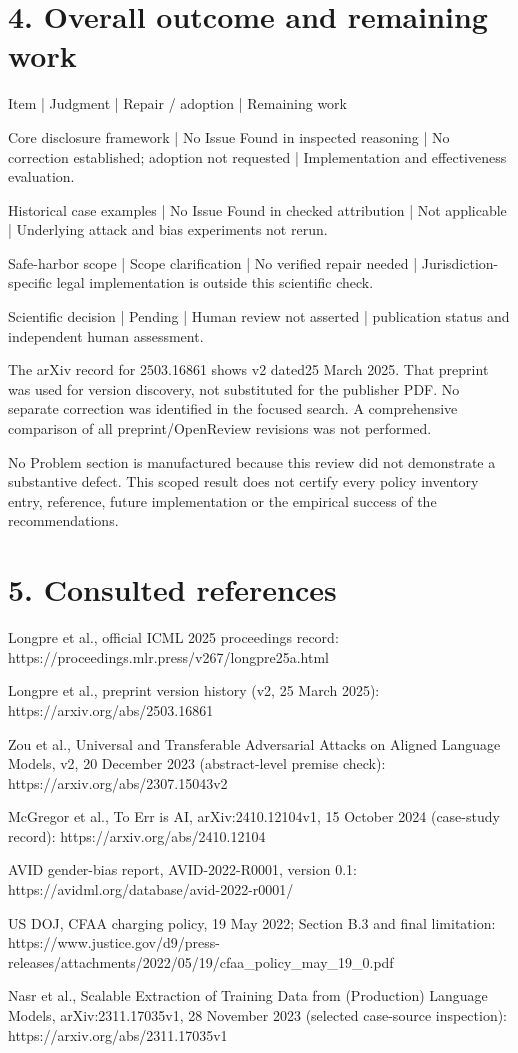\documentclass[10pt]{article}
\begin{document}
\section*{4. Overall outcome and remaining work}
Item | Judgment | Repair / adoption | Remaining work\par
Core disclosure framework | No Issue Found in inspected reasoning | No correction established; adoption not requested | Implementation and effectiveness evaluation.\par
Historical case examples | No Issue Found in checked attribution | Not applicable | Underlying attack and bias experiments not rerun.\par
Safe-harbor scope | Scope clarification | No verified repair needed | Jurisdiction-specific legal implementation is outside this scientific check.\par
Scientific decision | Pending | Human review not asserted | publication status and independent human assessment.\par
The arXiv record for 2503.16861 shows v2 dated25 March 2025. That preprint was used for version discovery, not substituted for the publisher PDF. No separate correction was identified in the focused search. A comprehensive comparison of all preprint/OpenReview revisions was not performed.\par
No Problem section is manufactured because this review did not demonstrate a substantive defect. This scoped result does not certify every policy inventory entry, reference, future implementation or the empirical success of the recommendations.\par
\section*{5. Consulted references}
Longpre et al., official ICML 2025 proceedings record: https://proceedings.mlr.press/v267/longpre25a.html\par
Longpre et al., preprint version history (v2, 25 March 2025): https://arxiv.org/abs/2503.16861\par
Zou et al., Universal and Transferable Adversarial Attacks on Aligned Language Models, v2, 20 December 2023 (abstract-level premise check): https://arxiv.org/abs/2307.15043v2\par
McGregor et al., To Err is AI, arXiv:2410.12104v1, 15 October 2024 (case-study record): https://arxiv.org/abs/2410.12104\par
AVID gender-bias report, AVID-2022-R0001, version 0.1: https://avidml.org/database/avid-2022-r0001/\par
US DOJ, CFAA charging policy, 19 May 2022; Section B.3 and final limitation: https://www.justice.gov/d9/press-releases/attachments/2022/05/19/cfaa\_policy\_may\_19\_0.pdf\par
Nasr et al., Scalable Extraction of Training Data from (Production) Language Models, arXiv:2311.17035v1, 28 November 2023 (selected case-source inspection): https://arxiv.org/abs/2311.17035v1\par
\end{document}
